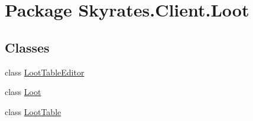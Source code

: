\hypertarget{namespace_skyrates_1_1_client_1_1_loot}{\section{Package Skyrates.\-Client.\-Loot}
\label{namespace_skyrates_1_1_client_1_1_loot}
}
\subsection*{Classes}
\begin{DoxyCompactItemize}
\item 
class \hyperlink{class_skyrates_1_1_client_1_1_loot_1_1_loot_table_editor}{Loot\-Table\-Editor}
\item 
class \hyperlink{class_skyrates_1_1_client_1_1_loot_1_1_loot}{Loot}
\item 
class \hyperlink{class_skyrates_1_1_client_1_1_loot_1_1_loot_table}{Loot\-Table}
\end{DoxyCompactItemize}
